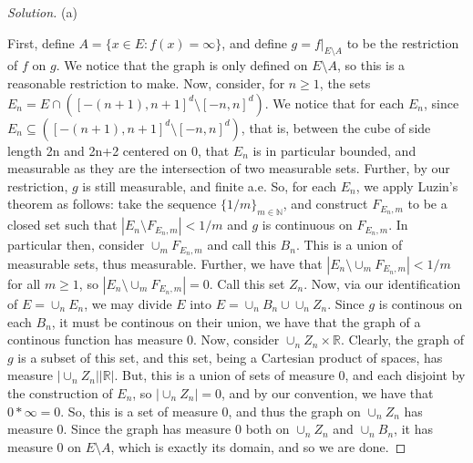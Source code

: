 \documentclass[10pt]{article}
\begin{document}
\begin{proof}[Solution]
(a)

First, define $A = \{ x \in E : f(x) = \infty \}$, and define $g = \left.f\right|_{E \setminus A}$ to be the restriction of $f$ on $g$. We notice that the graph is only defined on $E \setminus A$, so this is a reasonable restriction to make. Now, consider, for $n \geq 1$, the sets $E_n = E \cap  ([-(n+1),n+1]^d \setminus [-n,n]^d)$. We notice that for each $E_n$, since $E_n \subseteq ([-(n+1),n+1]^d \setminus [-n,n]^d)$, that is, between the cube of side length 2n and 2n+2 centered on $0$, that $E_n$ is in particular bounded, and measurable as they are the intersection of two measurable sets. Further, by our restriction, $g$ is still measurable, and finite a.e. So, for each $E_n$, we apply Luzin's theorem as follows: take the sequence $\{ 1/m \}_{m \in \mathbb{N}}$, and construct $F_{E_n,m}$ to be a closed set such that $|E_n \setminus F_{E_n,m}| < 1/m$ and $g$ is continuous on $ F_{E_n,m}$. In particular then, consider $\cup_m F_{E_n,m}$ and call this $B_n$. This is a union of measurable sets, thus measurable. Further, we have that $|E_n \setminus \cup_m F_{E_n,m}| < 1/m$ for all $m \geq 1$, so $|E_n \setminus \cup_m F_{E_n,m}| = 0$. Call this set $Z_n$. Now, via our identification of $E = \cup_n E_n$, we may divide $E$ into $E = \cup_n B_n \cup \cup_n Z_n$. Since $g$ is continous on each $B_n$, it must be continous on their union, we have that the graph of a continous function has measure 0. Now, consider $\cup_n Z_n \times \mathbb{R}$. Clearly, the graph of $g$ is a subset of this set, and this set, being a Cartesian product of spaces, has measure $|\cup_n Z_n||\mathbb{R}|$. But, this is a union of sets of measure 0, and each disjoint by the construction of $E_n$, so $|\cup_n Z_n | = 0$, and by our convention, we have that $0 * \infty = 0$. So, this is a set of measure 0, and thus the graph on $\cup_n Z_n$ has measure 0. Since the graph has measure 0 both on $\cup_n Z_n$ and $\cup_n B_n$, it has measure $0$ on $E \setminus A$, which is exactly its domain, and so we are done.



\end{proof}
\end{document}
